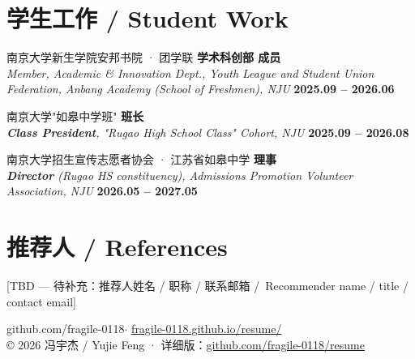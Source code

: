 \documentclass[11pt,a4paper]{article}
\newcommand{\cvdateinline}[1]{{\color{njublue}\small\bfseries #1}}
\newcommand{\muted}[1]{{\color{mutedgray}\small #1}}
\begin{document}
\section*{学生工作 \quad / \quad Student Work}

\begin{simpleitem}
南京大学新生学院安邦书院 · 团学联 \textbf{学术科创部 成员}\\
{\itshape\small Member, Academic \& Innovation Dept., Youth League and Student Union Federation, Anbang Academy (School of Freshmen), NJU}
\hfill \cvdateinline{2025.09 -- 2026.06}
\end{simpleitem}

\begin{simpleitem}
南京大学"如皋中学班" \textbf{班长}\\
{\itshape\small \textbf{Class President}, "Rugao High School Class" Cohort, NJU}
\hfill \cvdateinline{2025.09 -- 2026.08}
\end{simpleitem}

\begin{simpleitem}
南京大学招生宣传志愿者协会 · 江苏省如皋中学 \textbf{理事}\\
{\itshape\small \textbf{Director} (Rugao HS constituency), Admissions Promotion Volunteer Association, NJU}
\hfill \cvdateinline{2026.05 -- 2027.05}
\end{simpleitem}

\section*{推荐人 \quad / \quad References}

\muted{[TBD --- 待补充：推荐人姓名 / 职称 / 联系邮箱 \;/\, Recommender name / title / contact email]}

\vfill
\begin{center}
\small\color{mutedgray}
\faGithub\;github.com/fragile-0118\quad $\cdot$\quad
\href{https://fragile-0118.github.io/resume/}{fragile-0118.github.io/resume/}\\[2pt]
{\footnotesize © 2026 冯宇杰 / Yujie Feng \quad · \quad 详细版：\href{https://github.com/fragile-0118/resume}{github.com/fragile-0118/resume}}
\end{center}
\end{document}
